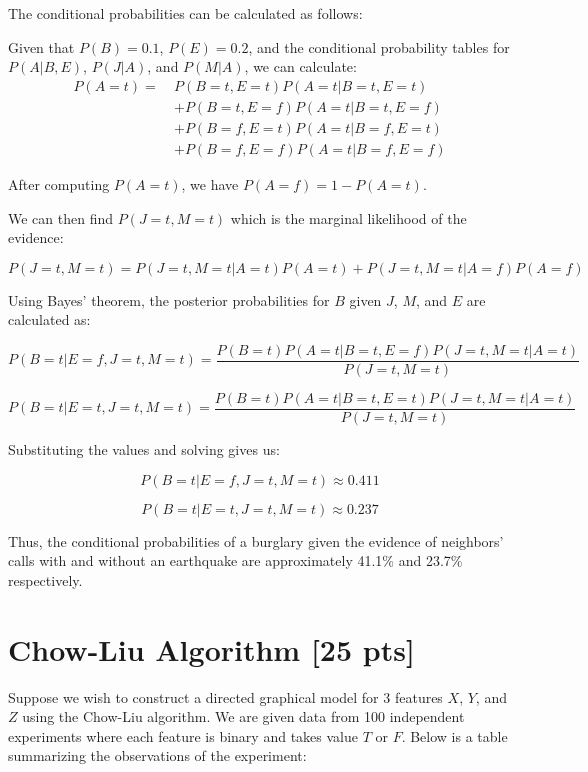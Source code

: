 \documentclass[a4paper]{article}
\theoremstyle{definition}
\newenvironment{soln}{
	\leavevmode\color{blue}\ignorespaces
}{}
\begin{document}
\begin{soln}
    The conditional probabilities can be calculated as follows:

    Given that \( P(B) = 0.1 \), \( P(E) = 0.2 \), and the conditional probability tables for \( P(A | B, E) \), \( P(J | A) \), and \( P(M | A) \), we can calculate:
    \begin{align*}
        P(A = t) =\ & P(B = t, E = t)P(A = t | B = t, E = t) \\
                   & + P(B = t, E = f)P(A = t | B = t, E = f) \\
                   & + P(B = f, E = t)P(A = t | B = f, E = t) \\
                   & + P(B = f, E = f)P(A = t | B = f, E = f)
    \end{align*}    

    After computing \( P(A = t) \), we have \( P(A = f) = 1 - P(A = t) \).

    We can then find \( P(J = t, M = t) \) which is the marginal likelihood of the evidence:

    \[
    P(J = t, M = t) = P(J = t, M = t | A = t)P(A = t) + P(J = t, M = t | A = f)P(A = f)
    \]

    Using Bayes' theorem, the posterior probabilities for \( B \) given \( J \), \( M \), and \( E \) are calculated as:

    \[
    P(B = t | E = f, J = t, M = t) = \frac{P(B = t)P(A = t | B = t, E = f)P(J = t, M = t | A = t)}{P(J = t, M = t)}
    \]

    \[
    P(B = t | E = t, J = t, M = t) = \frac{P(B = t)P(A = t | B = t, E = t)P(J = t, M = t | A = t)}{P(J = t, M = t)}
    \]

    Substituting the values and solving gives us:

    \[
    P(B = t | E = f, J = t, M = t) \approx 0.411
    \]

    \[
    P(B = t | E = t, J = t, M = t) \approx 0.237
    \]

    Thus, the conditional probabilities of a burglary given the evidence of neighbors' calls with and without an earthquake are approximately 41.1\% and 23.7\% respectively.
\end{soln}


\section{Chow-Liu Algorithm [25 pts]}
Suppose we wish to construct a directed graphical model for 3 features $X$, $Y$, and $Z$ using the Chow-Liu algorithm. We are given data from 100 independent experiments where each feature is binary and takes value $T$ or $F$. Below is a table summarizing the observations of the experiment:
\end{document}
